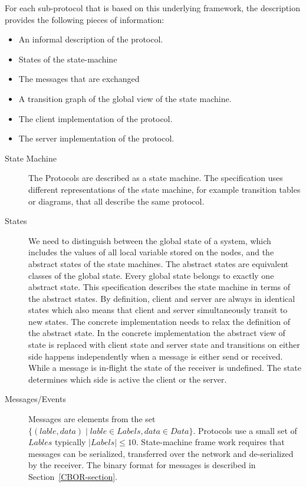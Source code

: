 \documentclass{report}
\theoremstyle{definition}{
  \newtheorem{lemma}{Lemma}[section] %
  \newtheorem{definition}[lemma]{Definition}
}
\theoremstyle{theorem}{
  \newtheorem{invariant}[lemma]{Invariant}
  \newtheorem{proofobligation}[lemma]{Proof Obligation}
}
\numberwithin{equation}{lemma}
\begin{document}
For each sub-protocol that is based on this underlying framework, the description provides the
following pieces of information:

\begin{itemize}
\item An informal description of the protocol.
\item States of the state-machine
\item The messages that are exchanged
\item A transition graph of the global view of the state machine.
\item The client implementation of the protocol.
\item The server implementation of the protocol.
\end{itemize}

\begin{description}
\item[State Machine]
  The Protocols are described as a state machine.
  The specification uses different representations of the state machine,
  for example transition tables or diagrams, that all describe the same protocol.

\item[States]
  We need to distinguish between the global state of a system,
  which includes the values of all local variable stored on the nodes,
  and the abstract states of the state machines.
  The abstract states are equivalent classes of the global state.
  Every global state belongs to exactly one abstract state.
  This specification describes the state machine in terms of the abstract states.
  By definition, client and server are always in identical states
  which also means that client and server simultaneously transit to new states.
  The concrete implementation needs to relax the definition of the abstract state.
  In the concrete implementation the abstract view of state is replaced with
  client state and server state and transitions on either side happens independently
  when a message is either send or received.
  While a message is in-flight the state of the receiver is undefined.
  The state determines which side is active the client or the server.
  
\item[Messages/Events]
  Messages are elements from the set
  $\{(lable, data) \mid lable \in Labels, data \in Data\}$.
  Protocols use a small set of $Lables$ typically $|Labels| \leq 10$.
  State-machine frame work requires that messages can be serialized,
  transferred over the network and de-serialized by the receiver.
  The binary format for messages is described in Section~\ref{CBOR-section}.


\end{description}
\end{document}
